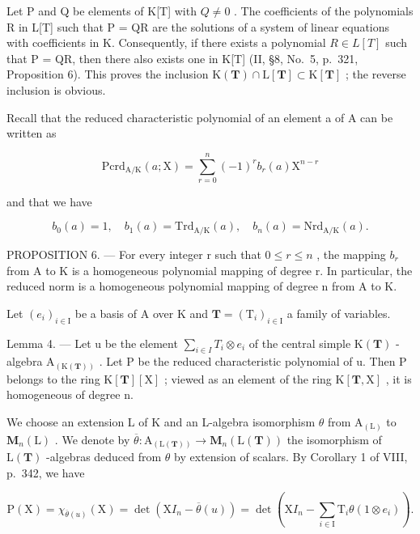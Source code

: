 Let P and Q be elements of K{[}T{]} with \(Q \neq 0\) . The coefficients of the polynomials R in L{[}T{]} such that P = QR are the solutions of a system of linear equations with coefficients in K. Consequently, if there exists a polynomial \(R \in L[T]\) such that P = QR, then there also exists one in K{[}T{]} (II, §8, No.~5, p.~321, Proposition 6). This proves the inclusion \(\mathrm{K}(\mathbf{T}) \cap \mathrm{L}[\mathbf{T}] \subset \mathrm{K}[\mathbf{T}]\) ; the reverse inclusion is obvious.

Recall that the reduced characteristic polynomial of an element a of A can be written as

\[
\mathrm{Pcrd} _ {\mathrm{A/K}} (a; \mathrm{X}) = \sum_ {r = 0} ^ {n} (- 1) ^ {r} b _ {r} (a) \mathrm{X} ^ {n - r}\tag{46}
\]

and that we have

\[
b _ {0} (a) = 1, \quad b _ {1} (a) = \mathrm{Trd} _ {\mathrm{A/K}} (a), \quad b _ {n} (a) = \mathrm{Nrd} _ {\mathrm{A/K}} (a).
\]

PROPOSITION 6. --- For every integer r such that \(0 \leqslant r \leqslant n\) , the mapping \(b_{r}\) from A to K is a homogeneous polynomial mapping of degree r. In particular, the reduced norm is a homogeneous polynomial mapping of degree n from A to K.

Let \((e_{i})_{i\in\mathrm{I}}\) be a basis of A over K and \(\mathbf{T}=(\mathrm{T}_{i})_{i\in\mathrm{I}}\) a family of variables.

Lemma 4. --- Let u be the element \(\sum_{i\in I}T_{i}\otimes e_{i}\) of the central simple \(\mathrm{K}(\mathbf{T})\) -algebra \(\mathrm{A}_{(\mathrm{K}(\mathbf{T}))}\) . Let P be the reduced characteristic polynomial of u. Then P belongs to the ring \(\mathrm{K}[\mathbf{T}][\mathrm{X}]\) ; viewed as an element of the ring \(\mathrm{K}[\mathbf{T},\mathrm{X}]\) , it is homogeneous of degree n.

We choose an extension L of K and an L-algebra isomorphism \(\theta\) from \(\mathrm{A}_{(\mathrm{L})}\) to \(\mathbf{M}_{n}(\mathrm{L})\) . We denote by \(\overline{\theta}: \mathrm{A}_{(\mathrm{L}(\mathbf{T}))} \to \mathbf{M}_{n}(\mathrm{L}(\mathbf{T}))\) the isomorphism of \(\mathrm{L}(\mathbf{T})\) -algebras deduced from \(\theta\) by extension of scalars. By Corollary 1 of VIII, p.~342, we have

\[
\mathrm{P} (\mathrm{X}) = \chi_ {\overline {{\theta}} (u)} (\mathrm{X}) = \det (\mathrm{X} I _ {n} - \overline {{\theta}} (u)) = \det \left(\mathrm{X} I _ {n} - \sum_ {i \in \mathrm{I}} \mathrm{T} _ {i} \theta (1 \otimes e _ {i})\right).\tag{47}
\]

